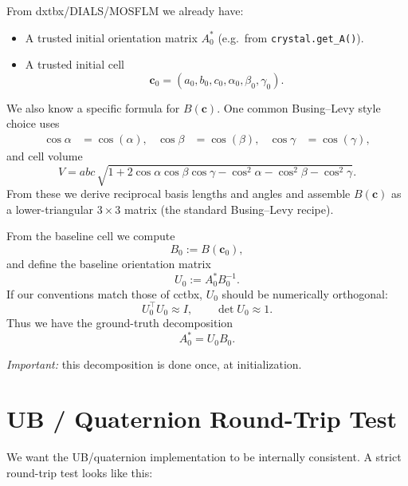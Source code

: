 \documentclass[11pt]{article}
\begin{document}
From dxtbx/DIALS/MOSFLM we already have:

\begin{itemize}
  \item A trusted initial orientation matrix $A^\ast_0$
        (e.g.\ from \verb|crystal.get_A()|).
  \item A trusted initial cell
        \begin{equation}
          \mathbf{c}_0 = (a_0, b_0, c_0, \alpha_0, \beta_0, \gamma_0).
        \end{equation}
\end{itemize}

We also know a specific formula for $B(\mathbf{c})$.
One common Busing--Levy style choice uses
\begin{align}
  \cos\alpha &= \cos(\alpha), &
  \cos\beta  &= \cos(\beta),  &
  \cos\gamma &= \cos(\gamma),
\end{align}
and cell volume
\begin{equation}
  V = a b c\,
      \sqrt{
        1 + 2\cos\alpha\cos\beta\cos\gamma
        - \cos^2\alpha - \cos^2\beta - \cos^2\gamma
      }.
\end{equation}
From these we derive reciprocal basis lengths and angles and assemble
$B(\mathbf{c})$ as a lower-triangular $3\times 3$ matrix (the standard
Busing--Levy recipe).

From the baseline cell we compute
\begin{equation}
  B_0 := B(\mathbf{c}_0),
\end{equation}
and define the baseline orientation matrix
\begin{equation}
  U_0 := A^\ast_0 B_0^{-1}.
\end{equation}
If our conventions match those of cctbx, $U_0$ should be numerically orthogonal:
\begin{equation}
  U_0^\top U_0 \approx I, \qquad \det U_0 \approx 1.
\end{equation}
Thus we have the ground-truth decomposition
\begin{equation}
  A^\ast_0 = U_0 B_0.
\end{equation}

\noindent
\emph{Important:} this decomposition is done once, at initialization.

\section{UB / Quaternion Round-Trip Test}

We want the UB/quaternion implementation to be internally consistent.
A strict round-trip test looks like this:
\end{document}
